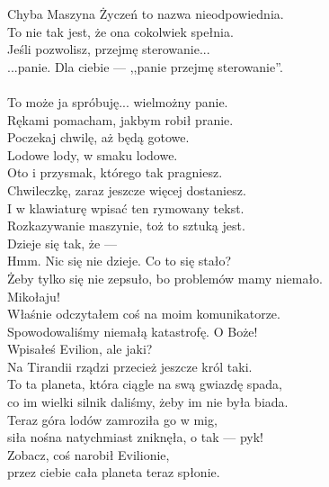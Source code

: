\charprzy{}
Chyba Maszyna Życzeń to nazwa nieodpowiednia.\\
To nie tak jest, że ona cokolwiek spełnia.\\
Jeśli pozwolisz, przejmę sterowanie...\\

\chardok{}
...panie.
Dla ciebie --- ,,panie przejmę sterowanie''.\\

\\

\charmik{}
To może ja spróbuję... wielmożny panie.\\
Rękami pomacham, jakbym robił pranie.\\
Poczekaj chwilę, aż będą gotowe.\\
Lodowe lody, w smaku lodowe.\\
Oto i przysmak, którego tak pragniesz.\\
Chwileczkę, zaraz jeszcze więcej dostaniesz.\\
I w klawiaturę wpisać ten rymowany tekst.\\
Rozkazywanie maszynie, toż to sztuką jest.\\
Dzieje się tak, że --- \\
Hmm. Nic się nie dzieje. Co to się stało?\\
Żeby tylko się nie zepsuło, bo problemów mamy niemało.\\

\charnad{}
Mikołaju!\\
Właśnie odczytałem coś na moim komunikatorze. \\
Spowodowaliśmy niemałą katastrofę. O Boże!\\
Wpisałeś Evilion, ale jaki?\\
Na Tirandii rządzi przecież jeszcze król taki.\\
To ta planeta, która ciągle na swą gwiazdę spada,\\
co im wielki silnik daliśmy, żeby im nie była biada.\\
Teraz góra lodów zamroziła go w mig,\\
siła nośna natychmiast zniknęła, o tak --- pyk!\\

\charmik{}
Zobacz, coś narobił Evilionie,\\
przez ciebie cała planeta teraz spłonie.\\

